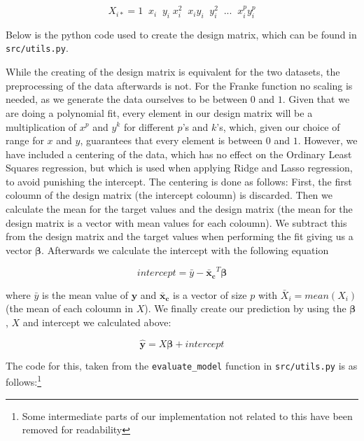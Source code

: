 \documentclass[twocolumn,10pt,cleanfoot]{asme2ej}
\begin{document}
\begin{equation}
X_{i*} = 1 \;\; x_i \;\; y_i \; x_i^2 \;\; x_i y_i \;\; y_i^2 \;\; ... \;\; x_i^p y_i^p
\end{equation}

Below is the python code used to create the design matrix, which can be found in \texttt{src/utils.py}.



While the creating of the design matrix is equivalent for the two datasets, the preprocessing of the data afterwards is not. For the Franke function no scaling is needed, as we generate the data ourselves to be between $0$ and $1$. Given that we are doing a polynomial fit, every element in our design matrix will be a multiplication of $x^p$ and $y^k$ for different $p$'s and $k$'s, which, given our choice of range for $x$ and $y$, guarantees that every element is between $0$ and $1$. However, we have included a centering of the data, which has no effect on the Ordinary Least Squares regression, but which is used when applying Ridge and Lasso regression, to avoid punishing the intercept. The centering is done as follows: First, the first coloumn of the design matrix (the intercept coloumn) is discarded. Then we calculate the mean for the target values and the design matrix (the mean for the design matrix is a vector with mean values for each coloumn). We subtract this from the design matrix and the target values when performing the fit giving us a vector $\bm{\beta}$. Afterwards we calculate the intercept with the following equation

\begin{equation}
	intercept = \bar{y} - \bm{\bar{x}_c}^T \bm{\beta}
\end{equation}

	where $\bar{y}$ is the mean value of $\bm{y}$ and $\bm{\bar{x}_c}$ is a vector of size $p$ with $\bar{X}_i = mean(X_i)$ (the mean of each coloumn in $X$). We finally create our prediction by using the $\bm{\beta}$, $X$ and intercept we calculated above:

\begin{equation}
	\bm{\hat{y}} = X \bm{\beta} + intercept
\end{equation}

The code for this, taken from the \texttt{evaluate\_model} function in \texttt{src/utils.py} is as follows:\footnote{Some intermediate parts of our implementation not related to this have been removed for readability}
\end{document}

